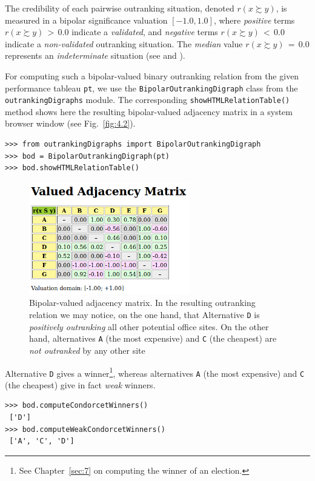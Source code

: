 The credibility of each pairwise outranking situation, denoted $r(x \succsim y)$, is measured in a bipolar significance valuation $[-1.0, 1.0]$, where \emph{positive} terms $r(x \succsim y)\, >\, 0.0$ indicate a \emph{validated}, and \emph{negative} terms $r(x \succsim y)\, <\, 0.0$ indicate a \emph{non-validated} outranking situation. The \emph{median} value $r(x \succsim y)\, = \,0.0$ represents an \emph{indeterminate} situation (see \citealp{BIS-2004a} and \citealp{BIS-2013}).   

For computing such a bipolar-valued binary outranking relation from the given performance tableau \texttt{pt}, we use the \texttt{BipolarOutrankingDigraph} class from the \texttt{outrankingDigraphs} module. The corresponding
\texttt{showHTMLRe\-lation\-Table()} method shows here the resulting bipolar-valued adjacency matrix in a system browser window (see Fig.~\vref{fig:4.2}).
\begin{lstlisting}[caption={Computing a bipolar-valued outranking digraph},label=list:4.3]
>>> from outrankingDigraphs import BipolarOutrankingDigraph
>>> bod = BipolarOutrankingDigraph(pt)
>>> bod.showHTMLRelationTable()
\end{lstlisting}
\begin{figure}[ht]
\sidecaption[t]
\includegraphics[width=7cm]{Figures/4-2-officeChoiceOutranking.png}
\caption{Bipolar-valued adjacency matrix. In the resulting outranking relation we may notice, on the one hand, that Alternative \texttt{D} is \emph{positively outranking} all other potential office sites. On the other hand, alternatives \texttt{A} (the most expensive) and \texttt{C} (the cheapest) are \emph{not outranked} by any other site}
\label{fig:4.2}       %
\end{figure}

Alternative \texttt{D} gives a \Condorcet winner\footnote{See Chapter~\ref{sec:7} on computing the winner of an election.}, whereas alternatives \texttt{A} (the most expensive) and \texttt{C} (the cheapest) give in fact \emph{weak} \Condorcet winners.
\begin{lstlisting}
>>> bod.computeCondorcetWinners()
 ['D']
>>> bod.computeWeakCondorcetWinners()
 ['A', 'C', 'D']
\end{lstlisting}

